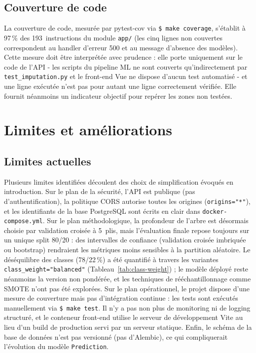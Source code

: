 \documentclass[12pt,a4paper,openany]{report}
\newcommand{\file}[1]{\texttt{#1}}
\newcommand{\cmd}[1]{\texttt{\$ #1}}
\begin{document}
\section{Couverture de code}

La couverture de code, mesurée par pytest-cov via \cmd{make coverage}, s'établit à 97\,\% des 193~instructions du module \file{app/} (les cinq lignes non couvertes correspondent au handler d'erreur 500 et au message d'absence des modèles). Cette mesure doit être interprétée avec prudence : elle porte uniquement sur le code de l'API - les scripts du pipeline ML ne sont couverts qu'indirectement par \file{test\_imputation.py} et le front-end Vue ne dispose d'aucun test automatisé - et une ligne exécutée n'est pas pour autant une ligne correctement vérifiée. Elle fournit néanmoins un indicateur objectif pour repérer les zones non testées.


\chapter{Limites et améliorations}

\section{Limites actuelles}

Plusieurs limites identifiées découlent des choix de simplification évoqués en introduction. Sur le plan de la sécurité, l'API est publique (pas d'authentification), la politique CORS autorise toutes les origines (\texttt{origins="*"}), et les identifiants de la base PostgreSQL sont écrits en clair dans \file{docker-compose.yml}. Sur le plan méthodologique, la profondeur de l'arbre est désormais choisie par validation croisée à 5~plis, mais l'évaluation finale repose toujours sur un unique split 80/20 : des intervalles de confiance (validation croisée imbriquée ou bootstrap) rendraient les métriques moins sensibles à la partition aléatoire. Le déséquilibre des classes (78/22\,\%) a été quantifié à travers les variantes \texttt{class\_weight="balanced"} (Tableau~\ref{tab:class-weight}) ; le modèle déployé reste néanmoins la version non pondérée, et les techniques de rééchantillonnage comme SMOTE n'ont pas été explorées. Sur le plan opérationnel, le projet dispose d'une mesure de couverture mais pas d'intégration continue : les tests sont exécutés manuellement via \cmd{make test}. Il n'y a pas non plus de monitoring ni de logging structuré, et le conteneur front-end utilise le serveur de développement Vite au lieu d'un build de production servi par un serveur statique. Enfin, le schéma de la base de données n'est pas versionné (pas d'Alembic), ce qui compliquerait l'évolution du modèle \texttt{Prediction}.
\end{document}
